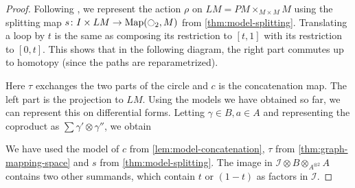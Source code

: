 \documentclass{scrartcl}
\theoremstyle{plain}
\theoremstyle{definition}
\DeclareMathOperator{\Map}{Map}
\begin{document}
\begin{proof}
Following \cite{naef2019string}, we represent the action $\rho$ on $LM = PM\times_{M\times M} M$ using the splitting map $s\colon I \times LM\to\Map(\ocircle_2, M)$ from \cref{thm:model-splitting}. Translating a loop by $t$ is the same as composing its restriction to $[t, 1]$ with its restriction to $[0, t]$. This shows that in the following diagram, the right part commutes up to homotopy (since the paths are reparametrized).

\begin{center}
\end{center}
Here $\tau$ exchanges the two parts of the circle and $c$ is the concatenation map. The left part is the projection to $LM$. Using the models we have obtained so far, we can represent this on differential forms. Letting $\gamma\in B, a\in A$ and representing the coproduct as $\sum \gamma'\otimes\gamma''$, we obtain 

\begin{center}
\end{center}

We have used the model of $c$ from \cref{lem:model-concatenation}, $\tau$ from \cref{thm:graph-mapping-space} and $s$ from \cref{thm:model-splitting}. The image in $\mathcal I \otimes B\otimes_{A^{\otimes 2}} A$ contains two other summands, which contain $t$ or $(1-t)$ as factors in $\mathcal I$. 


\end{proof}
\end{document}
